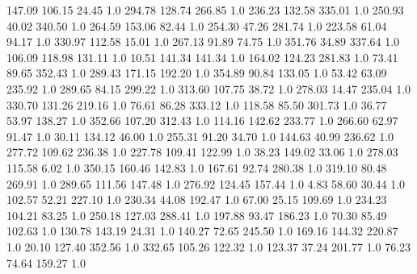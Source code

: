     147.09    106.15     24.45  1.0
    294.78    128.74    266.85  1.0
    236.23    132.58    335.01  1.0
    250.93     40.02    340.50  1.0
    264.59    153.06     82.44  1.0
    254.30     47.26    281.74  1.0
    223.58     61.04     94.17  1.0
    330.97    112.58     15.01  1.0
    267.13     91.89     74.75  1.0
    351.76     34.89    337.64  1.0
    106.09    118.98    131.11  1.0
     10.51    141.34    141.34  1.0
    164.02    124.23    281.83  1.0
     73.41     89.65    352.43  1.0
    289.43    171.15    192.20  1.0
    354.89     90.84    133.05  1.0
     53.42     63.09    235.92  1.0
    289.65     84.15    299.22  1.0
    313.60    107.75     38.72  1.0
    278.03     14.47    235.04  1.0
    330.70    131.26    219.16  1.0
     76.61     86.28    333.12  1.0
    118.58     85.50    301.73  1.0
     36.77     53.97    138.27  1.0
    352.66    107.20    312.43  1.0
    114.16    142.62    233.77  1.0
    266.60     62.97     91.47  1.0
     30.11    134.12     46.00  1.0
    255.31     91.20     34.70  1.0
    144.63     40.99    236.62  1.0
    277.72    109.62    236.38  1.0
    227.78    109.41    122.99  1.0
     38.23    149.02     33.06  1.0
    278.03    115.58      6.02  1.0
    350.15    160.46    142.83  1.0
    167.61     92.74    280.38  1.0
    319.10     80.48    269.91  1.0
    289.65    111.56    147.48  1.0
    276.92    124.45    157.44  1.0
      4.83     58.60     30.44  1.0
    102.57     52.21    227.10  1.0
    230.34     44.08    192.47  1.0
     67.00     25.15    109.69  1.0
    234.23    104.21     83.25  1.0
    250.18    127.03    288.41  1.0
    197.88     93.47    186.23  1.0
     70.30     85.49    102.63  1.0
    130.78    143.19     24.31  1.0
    140.27     72.65    245.50  1.0
    169.16    144.32    220.87  1.0
     20.10    127.40    352.56  1.0
    332.65    105.26    122.32  1.0
    123.37     37.24    201.77  1.0
     76.23     74.64    159.27  1.0